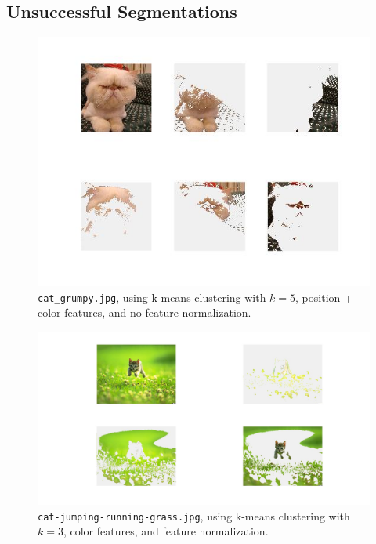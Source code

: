 \documentclass[12pt]{article}
\begin{document}
\subsection{Unsuccessful Segmentations}
\begin{figure}[H]
	\centering
	\includegraphics[width=.9\textwidth]{unsucc1.jpg}
	\caption{\texttt{cat\_grumpy.jpg}, using k-means clustering with $k = 5$, position + color features, and no feature normalization.}
\end{figure}

\begin{figure}[H]
	\centering
	\includegraphics[width=.95\textwidth]{unsucc2.jpg}
	\caption{\texttt{cat-jumping-running-grass.jpg}, using k-means clustering with $k = 3$, color features, and feature normalization.}
\end{figure}
\end{document}
